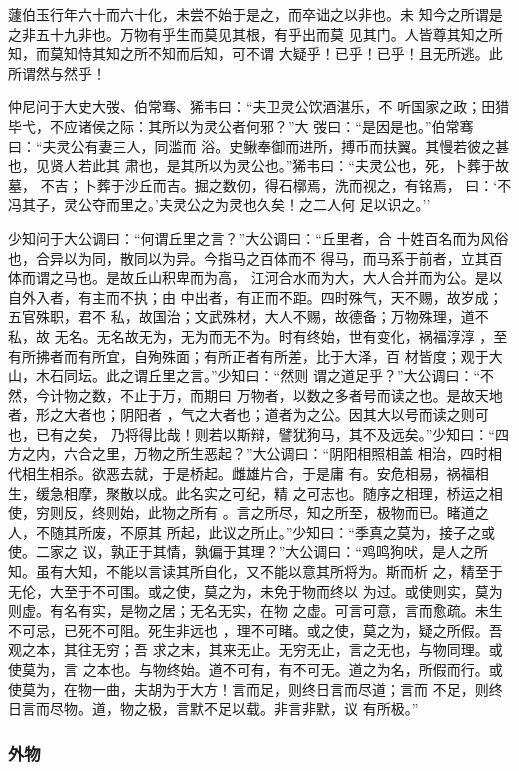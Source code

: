 \documentclass[]{article}
\begin{document}
蘧伯玉行年六十而六十化，未尝不始于是之，而卒诎之以非也。未
知今之所谓是之非五十九非也。万物有乎生而莫见其根，有乎出而莫
见其门。人皆尊其知之所知，而莫知恃其知之所不知而后知，可不谓
大疑乎！已乎！已乎！且无所逃。此所谓然与然乎！

仲尼问于大史大弢、伯常骞、狶韦曰：``夫卫灵公饮酒湛乐，不
听国家之政；田猎毕弋，不应诸侯之际：其所以为灵公者何邪？''大
弢曰：``是因是也。''伯常骞曰：``夫灵公有妻三人，同滥而
浴。史鳅奉御而进所，搏币而扶翼。其慢若彼之甚也，见贤人若此其
肃也，是其所以为灵公也。''狶韦曰：``夫灵公也，死，卜葬于故墓，
不吉；卜葬于沙丘而吉。掘之数仞，得石槨焉，洗而视之，有铭焉，
曰：`不冯其子，灵公夺而里之。'夫灵公之为灵也久矣！之二人何 足以识之。''

少知问于大公调曰：``何谓丘里之言？''大公调曰：``丘里者，合
十姓百名而为风俗也，合异以为同，散同以为异。今指马之百体而不
得马，而马系于前者，立其百体而谓之马也。是故丘山积卑而为高，
江河合水而为大，大人合并而为公。是以自外入者，有主而不执；由
中出者，有正而不距。四时殊气，天不赐，故岁成；五官殊职，君不
私，故国治；文武殊材，大人不赐，故德备；万物殊理，道不私，故
无名。无名故无为，无为而无不为。时有终始，世有变化，祸福淳淳
，至有所拂者而有所宜，自殉殊面；有所正者有所差，比于大泽，百
材皆度；观于大山，木石同坛。此之谓丘里之言。''少知曰：``然则
谓之道足乎？''大公调曰：``不然，今计物之数，不止于万，而期曰
万物者，以数之多者号而读之也。是故天地者，形之大者也；阴阳者
，气之大者也；道者为之公。因其大以号而读之则可也，已有之矣，
乃将得比哉！则若以斯辩，譬犹狗马，其不及远矣。''少知曰：``四
方之内，六合之里，万物之所生恶起？''大公调曰：``阴阳相照相盖
相治，四时相代相生相杀。欲恶去就，于是桥起。雌雄片合，于是庸
有。安危相易，祸福相生，缓急相摩，聚散以成。此名实之可纪，精
之可志也。随序之相理，桥运之相使，穷则反，终则始，此物之所有
。言之所尽，知之所至，极物而已。睹道之人，不随其所废，不原其
所起，此议之所止。''少知曰：``季真之莫为，接子之或使。二家之
议，孰正于其情，孰偏于其理？''大公调曰：``鸡鸣狗吠，是人之所
知。虽有大知，不能以言读其所自化，又不能以意其所将为。斯而析
之，精至于无伦，大至于不可围。或之使，莫之为，未免于物而终以
为过。或使则实，莫为则虚。有名有实，是物之居；无名无实，在物
之虚。可言可意，言而愈疏。未生不可忌，已死不可阻。死生非远也
，理不可睹。或之使，莫之为，疑之所假。吾观之本，其往无穷；吾
求之末，其来无止。无穷无止，言之无也，与物同理。或使莫为，言
之本也。与物终始。道不可有，有不可无。道之为名，所假而行。或
使莫为，在物一曲，夫胡为于大方！言而足，则终日言而尽道；言而
不足，则终日言而尽物。道，物之极，言默不足以载。非言非默，议 有所极。''

\hypertarget{header-n926}{%
\subsubsection{外物}\label{header-n926}}
\end{document}
